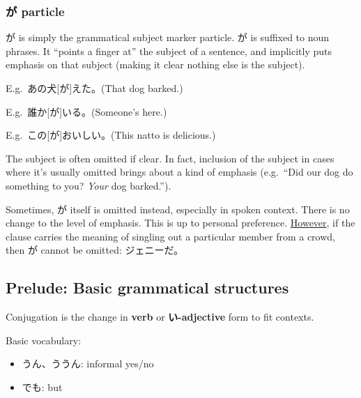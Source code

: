 \documentclass[../nihongo-gakushuu-kyouzai.tex]{subfiles}
\begin{document}
\subsubsection{が particle}

が is simply the grammatical subject marker particle. が is suffixed to noun phrases. It ``points a finger at'' the subject of a sentence, and implicitly puts emphasis on that subject (making it clear nothing else is the subject).

E.g.\ あの犬[が]えた。(That dog barked.)

E.g.\ 誰か[が]いる。(Someone's here.)

E.g.\ この[が]おいしい。(This natto is delicious.)


The subject is often omitted if clear. In fact, inclusion of the subject in cases where it's usually omitted brings about a kind of emphasis (e.g.\ ``Did our dog do something to you? \emph{Your} dog barked.'').

Sometimes, が itself is omitted instead, especially in spoken context. There is no change to the level of emphasis. This is up to personal preference. \ul{However}, if the clause carries the meaning of singling out a particular member from a crowd, then が cannot be omitted: ジェニーだ。


\subsection{Prelude: Basic grammatical structures}
Conjugation is the change in \textbf{verb} or \textbf{い-adjective} form to fit contexts.

Basic vocabulary:
\begin{itemize}
    \item うん、ううん: informal yes/no
    \item でも: but
\end{itemize}
\end{document}
